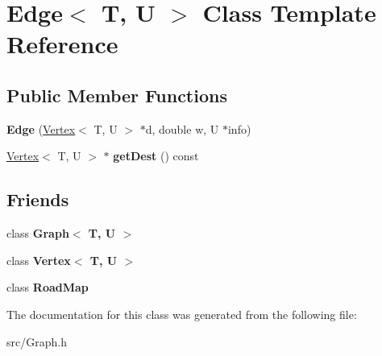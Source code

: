 \hypertarget{class_edge}{}\section{Edge$<$ T, U $>$ Class Template Reference}
\label{class_edge}
\subsection*{Public Member Functions}
\begin{DoxyCompactItemize}
\item 
{\bfseries Edge} (\hyperlink{class_vertex}{Vertex}$<$ T, U $>$ $\ast$d, double w, U $\ast$info)\hypertarget{class_edge_a6421f687786b59019b3073c336d8c678}{}\label{class_edge_a6421f687786b59019b3073c336d8c678}

\item 
\hyperlink{class_vertex}{Vertex}$<$ T, U $>$ $\ast$ {\bfseries get\+Dest} () const \hypertarget{class_edge_aafae8f89ff1638836b15f642dd073595}{}\label{class_edge_aafae8f89ff1638836b15f642dd073595}

\end{DoxyCompactItemize}
\subsection*{Friends}
\begin{DoxyCompactItemize}
\item 
class {\bfseries Graph$<$ T, U $>$}\hypertarget{class_edge_a3a700cfc5d314381d768caf37b1108b9}{}\label{class_edge_a3a700cfc5d314381d768caf37b1108b9}

\item 
class {\bfseries Vertex$<$ T, U $>$}\hypertarget{class_edge_ae7b6f9285e7e0e96ca9dcd25825ddfd4}{}\label{class_edge_ae7b6f9285e7e0e96ca9dcd25825ddfd4}

\item 
class {\bfseries Road\+Map}\hypertarget{class_edge_a4cadd08e990026c7a9877d35d45e719d}{}\label{class_edge_a4cadd08e990026c7a9877d35d45e719d}

\end{DoxyCompactItemize}


The documentation for this class was generated from the following file\+:\begin{DoxyCompactItemize}
\item 
src/Graph.\+h\end{DoxyCompactItemize}
